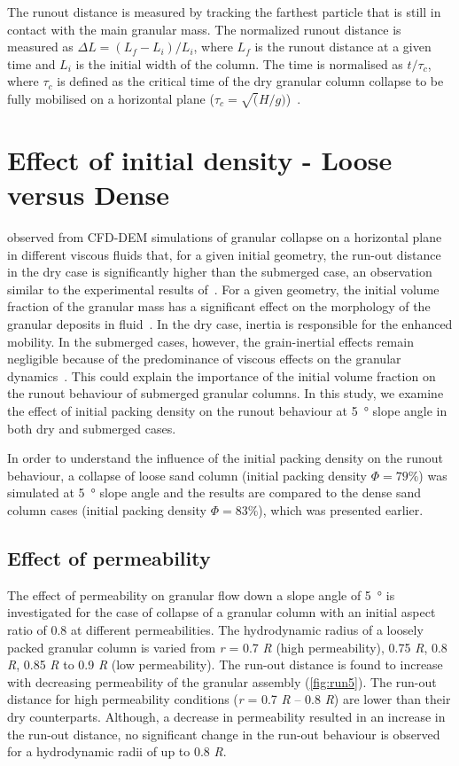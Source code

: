\documentclass[12pt,twoside]{tuhhproc-en}
\begin{document}
The runout distance is measured by tracking the farthest particle that is still in contact with the main granular mass. The normalized runout distance is measured as $\Delta L = (L_f - L_i)/ L_i$, where $L_f$ is the runout distance at a given time and $L_i$ is the initial width of the column. The time is normalised as $t / \tau_c$, where $\tau_c$ is defined as the critical time of the dry granular column collapse to be fully mobilised on a horizontal plane ($\tau_c = \sqrt(H/g)$)~\citep{Staron2007a}.

\section{Effect of initial density - Loose versus Dense}
\citet{Topin2011} observed from CFD-DEM simulations of granular collapse on a horizontal plane in different viscous fluids that, for a given initial geometry, the run-out distance in the dry case is significantly higher than the submerged case, an observation similar to the experimental results of~\citet{Cassar2005}. For a given geometry, the initial volume fraction of the granular mass has a significant effect on the morphology of the granular deposits in fluid~\citep{Rondon2011a, Pailha2008}. In the dry case, inertia is responsible for the enhanced mobility. In the submerged cases, however, the grain-inertial effects remain negligible because of the predominance of viscous effects on the granular dynamics~\citep{Topin2011}. This could explain the importance of the initial volume fraction on the runout behaviour of submerged granular columns. In this study, we examine the effect of initial packing density on the runout behaviour at \SI{5}{\degree} slope angle in both dry and submerged cases. 

In order to understand the influence of the initial packing density on the runout behaviour, a collapse of loose sand column (initial packing density $\Phi = 79\%$) was simulated at \SI{5}{\degree} slope angle and the results are compared to the dense sand column cases (initial packing density $\Phi = 83\%$), which was presented earlier. 

\subsection{Effect of permeability}

The effect of permeability on granular flow down a slope 
angle of \SI{5}{\degree} is investigated for the case of collapse of a granular column with an initial aspect ratio of 0.8 at different permeabilities. The 
hydrodynamic radius of a loosely packed granular column is varied from 
\textit{r} = 0.7 \textit{R} (high permeability), 0.75 \textit{R}, 0.8 
\textit{R}, 0.85 \textit{R} to 0.9 \textit{R} (low permeability). The run-out 
distance is found to increase with decreasing permeability of the granular 
assembly (\cref{fig:run5}). The run-out distance for high permeability 
conditions (\textit{r} = 0.7 \textit{R} -- 0.8 \textit{R}) are lower than their 
dry counterparts. Although, a decrease in permeability resulted in an increase 
in the run-out distance, no significant change in the run-out behaviour is 
observed for a hydrodynamic radii of up to 0.8 \textit{R}.
\end{document}
